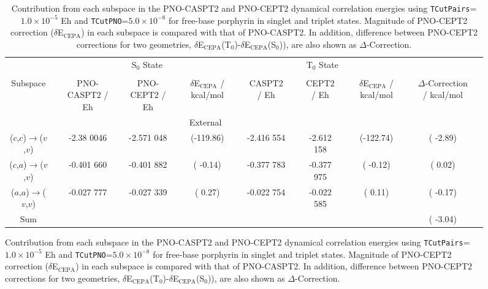 \documentclass[aip,jcp,amsmath]{revtex4-1}
\begin{document}
{
\squeezetable
\begin{figure}    
\begin{longtable}[!ht]{cccccccccccccccc}
  \caption{\label{tab:h2p-analysis}
    Contribution from each subspace in the PNO-CASPT2 and PNO-CEPT2 dynamical correlation energies using {\tt TCutPairs}=$1.0\times 10^{-5}$ Eh and {\tt TCutPNO}=$5.0\times 10^{-8}$ for free-base porphyrin in singlet and triplet states.
    Magnitude of PNO-CEPT2 correction ($\delta$E${}_\text{CEPA}$) in each subspace is compared with that of PNO-CASPT2.
    In addition, difference between PNO-CEPT2 corrections for two geometries, $\delta$E${}_\text{CEPA}$(T${}_0$)-$\delta$E${}_\text{CEPA}$(S${}_0$)), are also shown as $\Delta$-Correction.
}
  \\
\hline  
\hline
 {}                                                               && \multicolumn{5}{c}{S${}_0$ State} && \multicolumn{5}{c}{T${}_0$ State} \\
\cline{3-14} \\      
 Subspace                                                         && PNO-CASPT2 / Eh && PNO-CEPT2 / Eh && $\delta$E${}_\text{CEPA}$ / kcal/mol && CASPT2 / Eh && CEPT2 / Eh && $\delta$E${}_\text{CEPA}$ / kcal/mol && $\Delta$-Correction / kcal/mol \\
\hline
                                                                  && \multicolumn{10}{c}{External} \\
($c$,$c$)$\rightarrow$($v$,$v$)                                   && -2.38 0046  && -2.571 048  && (-119.86)  && -2.416 554  && -2.612 158  && (-122.74)  && (  -2.89)\\
($c$,$a$)$\rightarrow$($v$,$v$)                                   && -0.401 660  && -0.401 882  && (  -0.14)  && -0.377 783  && -0.377 975  && (  -0.12)  && (   0.02)\\
($a$,$a$)$\rightarrow$($v$,$v$)                                   && -0.027 777  && -0.027 339  && (   0.27)  && -0.022 754  && -0.022 585  && (   0.11)  && (  -0.17)\\
Sum                                                               &&             &&             &&            &&             &&             &&            && (  -3.04)\\
                                                                                                                                          

\end{longtable}
\end{figure}}
\end{document}
